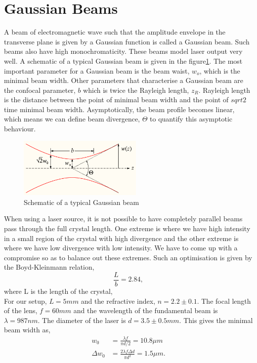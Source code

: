 \section{Gaussian Beams}
A beam of electromagnetic wave such that the amplitude envelope in the transverse plane is given by a Gaussian function is called a Gaussian beam. Such beams also have high monochromaticity. These beams model laser output very well. A schematic of a typical Gaussian beam is given in the figure\ref{fig:gaussianbeam}. The most important parameter for a Gaussian beam is the beam waist, $w_o$, which is the minimal beam width. Other parameters that characterise a Gaussian beam are the confocal parameter, $b$ which is twice the Rayleigh length, $z_R$. Rayleigh length is the distance between the point of minimal beam width and the point of $sqrt{2}$ time minimal beam width. Asymptotically, the beam profile becomes linear, which means we can define beam divergence, $\Theta$ to quantify this asymptotic behaviour.\\
\begin{figure}[h!]
    \centering
    \includegraphics[width = 6cm]{gaussianbeam.png}
    \caption{Schematic of a typical Gaussian beam\cite{gaussbeam}}
    \label{fig:gaussianbeam}
\end{figure}
When using a laser source, it is not possible to have completely parallel beams pass through the full crystal length. One extreme is where we have high intensity in a small region of the crystal with high divergence and the other extreme is where we have low divergence with low intensity. We have to come up with a compromise so as to balance out these extremes. Such an optimisation is given by the Boyd-Kleinmann relation,
\begin{equation}
    \frac{L}{b} = 2.84,
\end{equation}
where L is the length of the crystal,\\
For our setup, $L = 5mm$ and the refractive index, $n = 2.2 \pm 0.1$. The focal length of the lens, $f = 60mm$ and the wavelength of the fundamental beam is $\lambda = 987 nm$. The diameter of the laser is $d = 3.5 \pm 0.5mm$. This gives the minimal beam width as,
\begin{equation}
\begin{split}
    w_0 &= \frac{\lambda f}{\pi d/2} = 10.8 \mu m \\
    \Delta w_0 &= \frac{2\lambda f\Delta d}{\pi d^2} = 1.5 \mu m.
\end{split}
\end{equation}

